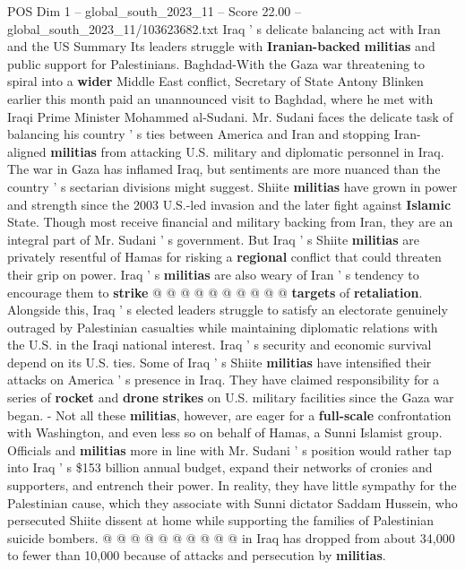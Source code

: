 \begin{textsample}{POS Dim 1 – global\_south\_2023\_11 – Score 22.00 – global\_south\_2023\_11/103623682.txt}  \label{ex:f1_pos_221}
Iraq ' s delicate balancing act with Iran and the US Summary Its leaders struggle with \textbf{Iranian-backed} \textbf{militias} and public support for Palestinians.
Baghdad-With the Gaza war threatening to spiral into a \textbf{wider} Middle East conflict, Secretary of State Antony Blinken earlier this month paid an unannounced visit to Baghdad, where he met with Iraqi Prime Minister Mohammed al-Sudani.
Mr.
Sudani faces the delicate task of balancing his country ' s ties between America and Iran and stopping Iran-aligned \textbf{militias} from attacking U.S. military and diplomatic personnel in Iraq.
The war in Gaza has inflamed Iraq, but sentiments are more nuanced than the country ' s sectarian divisions might suggest.
Shiite \textbf{militias} have grown in power and strength since the 2003 U.S.-led invasion and the later fight against \textbf{Islamic} State.
Though most receive financial and military backing from Iran, they are an integral part of Mr.
Sudani ' s government.
But Iraq ' s Shiite \textbf{militias} are privately resentful of Hamas for risking a \textbf{regional} conflict that could threaten their grip on power.
Iraq ' s \textbf{militias} are also weary of Iran ' s tendency to encourage them to \textbf{strike} @ @ @ @ @ @ @ @ @ @ \textbf{targets} of \textbf{retaliation}.
Alongside this, Iraq ' s elected leaders struggle to satisfy an electorate genuinely outraged by Palestinian casualties while maintaining diplomatic relations with the U.S. in the Iraqi national interest.
Iraq ' s security and economic survival depend on its U.S. ties.
Some of Iraq ' s Shiite \textbf{militias} have intensified their attacks on America ' s presence in Iraq.
They have claimed responsibility for a series of \textbf{rocket} and \textbf{drone} \textbf{strikes} on U.S. military facilities since the Gaza war began. - Not all these \textbf{militias}, however, are eager for a \textbf{full-scale} confrontation with Washington, and even less so on behalf of Hamas, a Sunni Islamist group.
Officials and \textbf{militias} more in line with Mr.
Sudani ' s position would rather tap into Iraq ' s \$153 billion annual budget, expand their networks of cronies and supporters, and entrench their power.
In reality, they have little sympathy for the Palestinian cause, which they associate with Sunni dictator Saddam Hussein, who persecuted Shiite dissent at home while supporting the families of Palestinian suicide bombers. @ @ @ @ @ @ @ @ @ @ in Iraq has dropped from about 34,000 to fewer than 10,000 because of attacks and persecution by \textbf{militias}.

\end{textsample}
